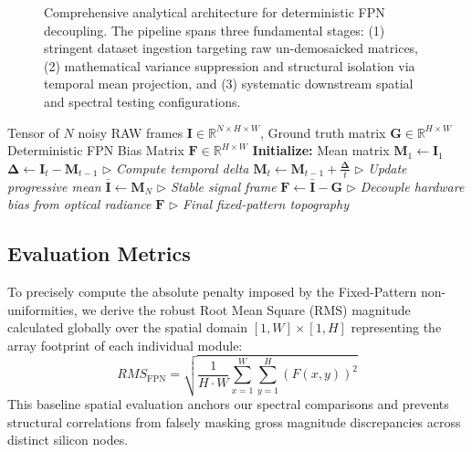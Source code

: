 \documentclass[conference]{IEEEtran}
\begin{document}
\begin{figure}[htbp]
\caption{Comprehensive analytical architecture for deterministic FPN decoupling. The pipeline spans three fundamental stages: (1) stringent dataset ingestion targeting raw un-demosaicked matrices, (2) mathematical variance suppression and structural isolation via temporal mean projection, and (3) systematic downstream spatial and spectral testing configurations.}
\label{fig:architecture}
\end{figure}

\begin{algorithm}[tbh]
\caption{Online FPN Tensor Decoupling Process}
\label{alg:fpn_extract}
\begin{algorithmic}[1]
\renewcommand{\algorithmicrequire}{\textbf{Input:}}
\renewcommand{\algorithmicensure}{\textbf{Output:}}
\REQUIRE Tensor of $N$ noisy RAW frames $\mathbf{I} \in \mathbb{R}^{N \times H \times W}$, Ground truth matrix $\mathbf{G} \in \mathbb{R}^{H \times W}$
\ENSURE Deterministic FPN Bias Matrix $\mathbf{F} \in \mathbb{R}^{H \times W}$
\STATE \textbf{Initialize:} Mean matrix $\mathbf{M}_1 \leftarrow \mathbf{I}_1$
    \STATE $\mathbf{\Delta} \leftarrow \mathbf{I}_t - \mathbf{M}_{t-1}$ \quad $\triangleright$ \textit{Compute temporal delta}
    \STATE $\mathbf{M}_t \leftarrow \mathbf{M}_{t-1} + \frac{\mathbf{\Delta}}{t}$ \quad $\triangleright$ \textit{Update progressive mean}
\ENDFOR
\STATE $\bar{\mathbf{I}} \leftarrow \mathbf{M}_N$ \quad $\triangleright$ \textit{Stable signal frame}
\STATE $\mathbf{F} \leftarrow \bar{\mathbf{I}} - \mathbf{G}$ \quad $\triangleright$ \textit{Decouple hardware bias from optical radiance}
\RETURN $\mathbf{F}$ \quad $\triangleright$ \textit{Final fixed-pattern topography}
\end{algorithmic}
\end{algorithm}

\subsection{Evaluation Metrics}
To precisely compute the absolute penalty imposed by the Fixed-Pattern non-uniformities, we derive the robust Root Mean Square (RMS) magnitude calculated globally over the spatial domain $[1, W] \times [1, H]$ representing the array footprint of each individual module:
\begin{equation}
    RMS_{\text{FPN}} = \sqrt{\frac{1}{H \cdot W} \sum_{x=1}^{W} \sum_{y=1}^{H} \left( F(x,y) \right)^{2}}
\end{equation}
This baseline spatial evaluation anchors our spectral comparisons and prevents structural correlations from falsely masking gross magnitude discrepancies across distinct silicon nodes.
\end{document}
